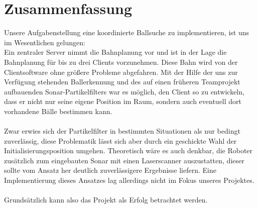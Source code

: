 
\chapter{Zusammenfassung}
\label{cha:zusammenfassung}
Unsere Aufgabenstellung eine koordinierte Ballsuche 
zu implementieren, ist uns im Wesentlichen gelungen:\\
Ein zentraler Server nimmt die Bahnplanung vor und ist in der Lage die
Bahnplanung für bis zu drei Clients vorzunehmen. Diese Bahn wird von
der Clientsoftware ohne größere Probleme abgefahren. Mit der Hilfe der
uns zur Verfügung stehenden Ballerkennung und des
auf einen früheren Teamprojekt aufbauenden Sonar-Partikelfilters war
es möglich, den Client so zu
entwickeln, dass er nicht nur seine eigene Position im Raum, sondern
auch eventuell dort vorhandene Bälle bestimmen kann. \\\\
Zwar erwies sich der Partikelfilter in bestimmten Situationen als nur
bedingt zuverlässig, diese Problematik lässt sich aber durch ein
geschickte Wahl der Initialisierungsposition umgehen. Theoretisch wäre
es auch denkbar, die Roboter zusätzlich zum eingebauten Sonar mit
einen Laserscanner auszustatten, dieser sollte vom Ansatz her deutlich
zuverlässigere Ergebnisse liefern. Eine Implementierung dieses
Ansatzes lag allerdings nicht im Fokus unseres Projektes. \\\\
Grundsätzlich kann also das Projekt als Erfolg betrachtet werden.
